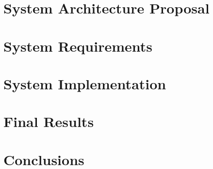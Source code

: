 \documentclass[
  oneside,
  11pt, a4paper,
  footinclude=true,
  headinclude=true,
  cleardoublepage=empty
]{scrbook}
\begin{document}
	\chapter{System Architecture Proposal}
	

	\chapter{System Requirements}
	

	\chapter{System Implementation}
	

	\chapter{Final Results}
	

	\chapter{Conclusions}
	

	\cleardoublepage

	
\end{document}
